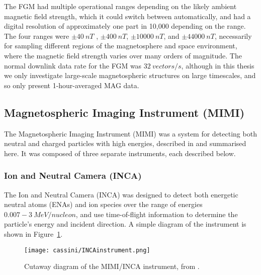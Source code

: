 The FGM had multiple operational ranges depending on the likely ambient magnetic field strength, which it could switch between automatically, and had a digital resolution of approximately one part in 10,000 depending on the range. The four ranges were $\pm\SI{40}{nT}$ , $\pm\SI{400}{nT}$, $\pm\SI{10000}{nT}$, and $\pm\SI{44000}{nT}$, necessarily for sampling different regions of the magnetosphere and space environment, where the magnetic  field strength  varies over many orders of magnitude. The normal downlink data rate for the FGM was $\SI{32}{vectors/s}$, although in this thesis we only investigate large-scale magnetospheric structures on large timescales, and so only present 1-hour-averaged MAG data.

\subsection{Magnetospheric Imaging Instrument (MIMI)}
The Magnetospheric Imaging Instrument (MIMI) was a system for detecting both neutral and charged particles with high energies, described in \citet{krimigis2004} and summarised here. It was composed of three separate instruments, each described below.
\subsubsection{Ion and Neutral Camera (INCA)}
The Ion and Neutral Camera (INCA) was designed to detect both energetic neutral atoms (ENAs) and ion species over the range of energies $0.007-\SI{3}{MeV/nucleon}$, and use time-of-flight information to determine the particle's energy and incident direction. A simple diagram of the instrument is shown in Figure~\ref{cassini:fig:INCAinstrument}.

\begin{figure}
\centering
\noindent\texttt{[image: cassini/INCAinstrument.png]}
\caption[Diagram of the MIMI/INCA instrument.]{Cutaway diagram of the MIMI/INCA instrument, from \citet{krimigis2004}.}
\label{cassini:fig:INCAinstrument}
\end{figure}

